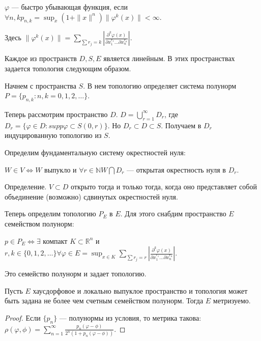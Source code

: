 \documentclass[10pt]{article}
\begin{document}
\begin{df}
  $\varphi$ --- быстро убывающая функция, если $\forall
  n,k  p_{n,k}=\sup_x(1+\|x\|^n)\|\varphi^k(x)\|<\infty$.
\end{df}

\begin{df}
  Здесь $\|\varphi^k(x)\|=\sum_{\sum
    r_j=k}|\frac{\partial^k\varphi(x)}{\partial x^{r_1}_{1 } \ldots
    \partial  x^{r_n}_{n }}|$.
\end{df}

Каждое из пространств $D, S, E$ является линейным. В этих
пространствах задается топология следующим образом.

Начнем с пространства $S$. В нем топологию определяет система
полунорм $P=\{p_{n,k}: n,k=0,1,2,\ldots\}$.

Теперь рассмотрим пространство $D$. $D=\bigcup_{r=1}^{\infty}D_r$,
где $D_{r}=\{\varphi\in D: supp \varphi\subset S(0,r)\}$. Но $D_r
\subset D\subset S$. Получаем в $D_r$ индуцированную топологию из
$S$.

Определим фундаментальную систему окрестностей нуля:

$W\in V \Longleftrightarrow W $ выпукло и $\forall r\in \mathbb{N}
W\bigcap D_r$ --- открытая окрестность нуля в $D_r$.

Определение. $V\subset D$ открыто тогда и только тогда, когда оно
представляет собой объединение (возможно) сдвинутых окрестностей
нуля.

Теперь определим топологию $P_E$ в $E$. Для этого снабдим
пространство $E$ семейством полунорм:

$p\in P_E \Longleftrightarrow \exists$ компакт $K\subset
\mathbb{R}^n$ и $r,k\in \{0,1,2,\ldots\} \forall \varphi \in
E=\sup_{x\in K}\sum_{\sum
r_j=r}|\frac{\partial^k\varphi(x)}{\partial x^{r_1}_{1 } \ldots
\partial  x^{r_n}_{n }}|$.

Это семейство полунорм и задает топологию.

\begin{theorem}
  Пусть $E$ хаусдорфовое и локально выпуклое пространство и
  топология может быть задана не более чем счетным семейством
  полунорм. Тогда $E$ метризуемо.
\end{theorem}

\begin{proof}
  Если $\{p_n\}$ --- полунормы из условия, то
  метрика такова:
  $\rho(\varphi,\phi)=\sum_{n=1}^{\infty}\frac{p_n(\varphi-\phi)}{2^n(1+p_n(\varphi-\phi))}$.
\end{proof}
\clearpage
\end{document}
